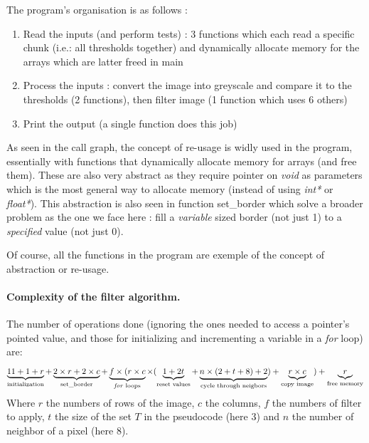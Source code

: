 \documentclass[a4paper]{report} %
\begin{document}
\SetEndCharOfAlgoLine{}

The program's organisation is as follows :
\begin{enumerate}
\item Read the inputs (and perform tests) : 3 functions which each read a specific chunk (i.e.: all thresholds together) and dynamically allocate memory for the arrays which are latter freed in main

\item Process the inputs : convert the image into greyscale and compare it to the thresholds (2 functions), then filter image (1 function which uses 6 others)

\item Print the output (a single function does this job)
\end{enumerate}

As seen in the call graph, the concept of re-usage is widly used in the program, essentially with functions that dynamically allocate memory for arrays (and free them).
These are also very abstract as they require pointer on \emph{void} as parameters which is the most general way to allocate memory (instead of using \emph{int*} or \emph{float*}).
This abstraction is also seen in function set\_border which solve a broader problem as the one we face here : fill a \emph{variable} sized border (not just 1) to a \emph{specified} value (not just 0).

Of course, all the functions in the program are exemple of the concept of abstraction or re-usage.

\paragraph{Complexity of the filter algorithm.} The number of operations done (ignoring the ones needed to access a pointer's pointed value, and those for initializing and incrementing a variable in a \emph{for} loop) are:
\[
\underbrace{11 + 1 + r }_{\text{initialization}}
+
\underbrace{2 \times r + 2 \times c }_{\text{set\_border}} 
+
\underbrace{ f \times ( r \times c }_{\text{\emph{for} loops}}
\times ( 
\underbrace{1+2t}_{\text{reset values}}
+ 
\underbrace{n \times (2 + t + 8) + 2}_{\text{cycle through neigbors}}
) + 
\underbrace{ r \times c }_{\text{copy image}}
)+ 
\underbrace{ r }_{\text{free memory}}
\]
Where $r$ the numbers of rows of the image, $c$ the columns, $f$ the numbers of filter to apply, $t$ the size of the set $T$ in the pseudocode (here $3$) and $n$ the number of neighbor of a pixel (here $8$).
\end{document}
